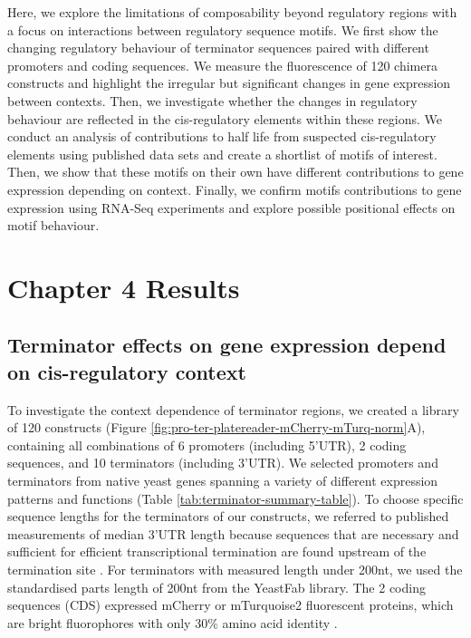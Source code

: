 \documentclass[../main.tex]{subfiles}
\begin{document}
Here, we explore the limitations of composability beyond regulatory regions with a focus on interactions between regulatory sequence motifs.
We first show the changing regulatory behaviour of terminator sequences paired with different promoters and coding sequences.
We measure the fluorescence of 120 chimera constructs and highlight the irregular but significant changes in gene expression between contexts. 
Then, we investigate whether the changes in regulatory behaviour are reflected in the cis-regulatory elements within these regions. 
We conduct an analysis of contributions to half life from suspected cis-regulatory elements using published data sets and create a shortlist of motifs of interest.
Then, we show that these motifs on their own have different contributions to gene expression depending on context. 
Finally, we confirm motifs contributions to gene expression using RNA-Seq experiments and explore possible positional effects on motif behaviour. 
 
\section{Chapter 4 Results}

\subsection{Terminator effects on gene expression depend on cis-regulatory context}

To investigate the context dependence of terminator regions, we created a library of 120 constructs (Figure \ref{fig:pro-ter-platereader-mCherry-mTurq-norm}A), containing all combinations of 6 promoters (including 5'UTR), 2 coding sequences, and 10 terminators (including 3'UTR).
We selected promoters and terminators from native yeast genes spanning a variety of different expression patterns and functions (Table \ref{tab:terminator-summary-table}).
To choose specific sequence lengths for the terminators of our constructs, we referred to published measurements of median 3'UTR length \parencite{Pelechano2013} because sequences that are necessary and sufficient for efficient transcriptional termination are found upstream of the termination site \parencite{Guo1996}.
For terminators with measured length under 200nt, we used the standardised parts length of 200nt from the YeastFab library.
The 2 coding sequences (CDS) expressed mCherry or mTurquoise2 fluorescent proteins, which are bright fluorophores with only 30\% amino acid identity \parencite{Shaner2004, Goedhart2012}.
\end{document}
